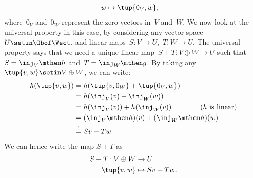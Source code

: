 {\begin{example}
\begin{equation}
\begin{aligned}
                w               & \mapsto \tup{0_V,w},
            \end{aligned}
        \end{equation}
        where~$0_V$ and~$0_W$ represent the zero vectors in~$V$ and~$W$.
        We now look at the universal property in this case, by considering any vector space $U\setin \Obof\Vect$, and linear maps~$S\colon V\to U$,~$T\colon W\to U$.
        The universal property says that we need a unique linear map~$S+T\colon V\oplus W \to U$ such that~$S=\inj_V\mthen h$ and~$T=\inj_W\mthen g$.
        By taking any~$\tup{v,w}\setin V\oplus W$, we can write:
        \begin{equation}
            \begin{aligned}
                h(\tup{v,w}) & =h(\tup{v,0_W}+\tup{0_V,w}) \\
                             & =h(\inj_V(v)+\inj_W(w)) \\
                             & =h(\inj_V(v))+h(\inj_W(v)) \qquad \qquad (h \text{ is linear}) \\
                             & =(\inj_V\mthen h)(v)+(\inj_W\mthen h)(w) \\
                             & \overset{!
                }{=}
                Sv+Tw.
            \end{aligned}
        \end{equation}
        We can hence write the map $S+T$ as
        \begin{equation}
            \begin{aligned}
                S+T\colon V\oplus W & \to U \\
                \tup{v,w}           & \mapsto Sv+Tw.
            \end{aligned}
        \end{equation}
    \end{example}
}
